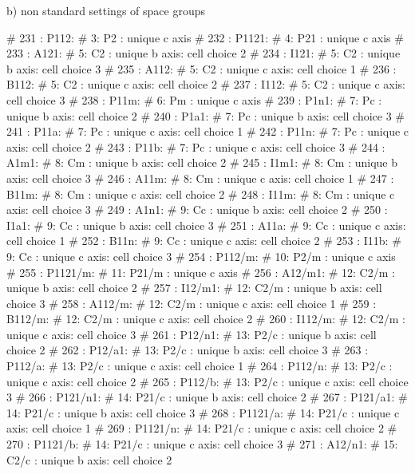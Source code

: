 b) non standard settings of space groups 
\par
\begin{MacVerbatim}
# 231 : P112:       #   3: P2 : unique c axis
# 232 : P1121:      #   4: P21 : unique c axis
# 233 : A121:       #   5: C2 : unique b axis: cell choice 2
# 234 : I121:       #   5: C2 : unique b axis: cell choice 3
# 235 : A112:       #   5: C2 : unique c axis: cell choice 1
# 236 : B112:       #   5: C2 : unique c axis: cell choice 2
# 237 : I112:       #   5: C2 : unique c axis: cell choice 3
# 238 : P11m:       #   6: Pm : unique c axis
# 239 : P1n1:       #   7: Pc : unique b axis: cell choice 2
# 240 : P1a1:       #   7: Pc : unique b axis: cell choice 3
# 241 : P11a:       #   7: Pc : unique c axis: cell choice 1
# 242 : P11n:       #   7: Pc : unique c axis: cell choice 2
# 243 : P11b:       #   7: Pc : unique c axis: cell choice 3
# 244 : A1m1:       #   8: Cm : unique b axis: cell choice 2
# 245 : I1m1:       #   8: Cm : unique b axis: cell choice 3
# 246 : A11m:       #   8: Cm : unique c axis: cell choice 1
# 247 : B11m:       #   8: Cm : unique c axis: cell choice 2
# 248 : I11m:       #   8: Cm : unique c axis: cell choice 3
# 249 : A1n1:       #   9: Cc : unique b axis: cell choice 2
# 250 : I1a1:       #   9: Cc : unique b axis: cell choice 3
# 251 : A11a:       #   9: Cc : unique c axis: cell choice 1
# 252 : B11n:       #   9: Cc : unique c axis: cell choice 2
# 253 : I11b:       #   9: Cc : unique c axis: cell choice 3
# 254 : P112/m:     #  10: P2/m : unique c axis
# 255 : P1121/m:    #  11: P21/m : unique c axis
# 256 : A12/m1:     #  12: C2/m : unique b axis: cell choice 2
# 257 : I12/m1:     #  12: C2/m : unique b axis: cell choice 3
# 258 : A112/m:     #  12: C2/m : unique c axis: cell choice 1
# 259 : B112/m:     #  12: C2/m : unique c axis: cell choice 2
# 260 : I112/m:     #  12: C2/m : unique c axis: cell choice 3
# 261 : P12/n1:     #  13: P2/c : unique b axis: cell choice 2
# 262 : P12/a1:     #  13: P2/c : unique b axis: cell choice 3
# 263 : P112/a:     #  13: P2/c : unique c axis: cell choice 1
# 264 : P112/n:     #  13: P2/c : unique c axis: cell choice 2
# 265 : P112/b:     #  13: P2/c : unique c axis: cell choice 3
# 266 : P121/n1:    #  14: P21/c : unique b axis: cell choice 2
# 267 : P121/a1:    #  14: P21/c : unique b axis: cell choice 3
# 268 : P1121/a:    #  14: P21/c : unique c axis: cell choice 1
# 269 : P1121/n:    #  14: P21/c : unique c axis: cell choice 2
# 270 : P1121/b:    #  14: P21/c : unique c axis: cell choice 3
# 271 : A12/n1:     #  15: C2/c : unique b axis: cell choice 2

\end{MacVerbatim}
